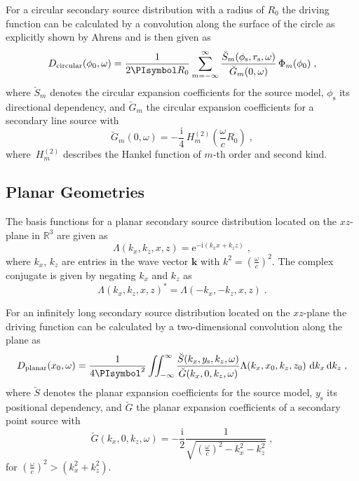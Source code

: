 \documentclass[a4paper]{book}
\newcommand{\PI}{\PIsymbol}%
\newcommand{\I}{\mathrm{i}}                          %
\newcommand{\E}{\mathrm{e}}                          %
\newcommand{\D}[1]{\mathop{\mathrm{d}{#1}}}          %
\renewcommand{\vec}[1]{\mathbf{#1}}                  %
\renewcommand{\k}{\vec{k}}                           %
\newcommand{\omegac}{\frac{\omega}{c}}               %
\renewcommand{\H}[2]{\,H_{#1}^{(#2)}\!}              %
\newcommand{\R}{\mathbb{R}}                          %
\newcommand{\qc}{\;,}                                             %
\newcommand{\qp}{\;.}                                             %
\begin{document}
{For a circular secondary source distribution with a radius of $R_0$ the
driving function can
be calculated by a convolution along the surface of the circle as explicitly
shown by Ahrens\cite{Ahrens2009c} and is then given as
%
\begin{equation}
    D_\text{circular}(\phi_0,\omega) = \frac{1}{2\PI R_0} \sum_{m=-\infty}^\infty 
    \frac{\breve{S}_m(\phi_\text{s},r_\text{s},\omega)}{\breve{G}_m(0,\omega)} \,
    \Phi_m(\phi_0) \qc
    \label{eq:D_circular}
\end{equation}
%
where $\breve{S}_m$ denotes the circular expansion coefficients for
the source model, $\phi_\text{s}$ its directional dependency, and $\breve{G}_m$
the circular expansion coefficients for a secondary line source with
%
\begin{equation}
    \breve{G}_m(0,\omega) = -\frac{\I}{4} \H{m}{2}\left(\omegac R_0\right) \qc
    \label{eq:G_circular}
\end{equation}
%
where $\H{m}{2}$ describes the Hankel function of $m$-th order and second kind.


\subsection{Planar Geometries}
\label{sec:planar_geometries}

The basis functions for a planar secondary source distribution
located on the $xz$-plane in $\R^3$ are given as
%
\begin{equation}
    \Lambda(k_x,k_z,x,z) = \E^{-\I(k_x x + k_z z)} \qc
    \label{eq:planar_harmonics}
\end{equation}
%
where $k_x$, $k_z$ are entries in the wave vector $\k$ with $k^2 =
(\omegac)^2$.
The complex conjugate is given by negating $k_x$ and $k_z$ as
%
\begin{equation}
    \Lambda(k_x,k_z,x,z)^* = \Lambda(-k_x,-k_z,x,z) \qp
\end{equation}
%

For an infinitely long secondary source distribution located on the
$xz$-plane the driving function can be calculated by a two-dimensional
convolution along the plane as\cite[][(3.65)]{Ahrens2012}
%
\begin{equation}
    D_\text{planar}(x_0,\omega) = \frac{1}{4\PI^2} \iint_{-\infty}^\infty
    \frac{\breve{S}(k_x,y_\text{s},k_z,\omega)}{\breve{G}(k_x,0,k_z,\omega)}
    \Lambda(k_x,x_0,k_z,z_0) \, \D{k_x} \D{k_z} \qc
    \label{eq:D_planar}
\end{equation}
%
where $\breve{S}$ denotes the planar expansion coefficients for the
source model, $y_\text{s}$ its positional dependency, and $\breve{G}$ the planar
expansion coefficients of a secondary point source with\cite[][(65)]{Schultz2014}
%
\begin{equation}
    \breve{G}(k_x,0,k_z,\omega) = -\frac{\I}{2}
    \frac{1}{\sqrt{(\omegac)^2-k_x^2-k_z^2}}
    \qc
    \label{G_planar}
\end{equation}
%
for $(\omegac)^2 > (k_x^2+k_z^2)$.

}
\end{document}
